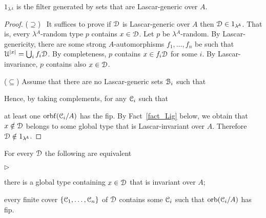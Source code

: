 \documentclass{amsproc}
\newcommand{\mylabel}[1]{{#1}\hfill}
\renewenvironment{itemize}
  {\begin{list}{$\triangleright$}{%
  \setlength{\parskip}{0mm}
  \setlength{\topsep}{.4\baselineskip}
  \setlength{\rightmargin}{0mm}
  \setlength{\listparindent}{0mm}
  \setlength{\itemindent}{0mm}
  \setlength{\labelwidth}{3ex}
  \setlength{\itemsep}{.2\baselineskip}
  \setlength{\parsep}{.2\baselineskip}
  \setlength{\partopsep}{0mm}
  \setlength{\labelsep}{1ex}
  \setlength{\leftmargin}{\labelwidth+\labelsep}
  \let\makelabel\mylabel}}{%
\end{list}}
\begin{document}
\begin{fact}
  $1_{\lambda\!^A}$ is the filter generated by sets that are Lascar-generic over $A$.
\end{fact}
  
\begin{proof}
  ($\supseteq$) \ It suffices to prove if $\EuScript D$ is Lascar-generic over $A$ then $\EuScript D\in1_{\lambda\!^A}$.
  That is, every $\lambda\!^A$-random type $p$ contains $x\in\EuScript D$.
  Let $p$ be $\lambda\!^A$-random.
  By Lascar-genericity, there are some strong $A$-automorphisms $f_1,\dots,f_n$ be such that $\EuScript U^{|x|}=\bigcup_i f_i\EuScript D$.
  By completeness, $p$ contains $x\in f_i\EuScript D$ for some $i$.
  By Lascar-invariance, $p$ contains also $x\in\EuScript D$.

  ($\subseteq$) Assume that there are no Lascar-generic sets $\EuScript B_i$ such that 


  Hence, by taking complements, for any $\EuScript C_i$ such that 
  

  at least one ${\rm orbf}(\EuScript C_i/A)$ has the fip.
  By Fact~\ref{fact_Lig} below, we obtain that $x\notin\EuScript D$ belongs to some global type that is Lascar-invariant over $A$.
  Therefore $\EuScript D\notin1_{\lambda\!^A}$.
\end{proof}

\begin{fact}
  For every $\EuScript D$ the following are equivalent
  \begin{itemize}
    \item [1.] there is a global type containing $x\in\EuScript D$ that is invariant over $A$;
    \item [2.] every finite cover  $\{\EuScript C_1,\dots,\EuScript C_n\}$ of $\EuScript D$ contains some $\EuScript C_i$ such that ${\rm orb}(\EuScript C_i/A)$ has fip.
  \end{itemize}
\end{fact}
\end{document}
